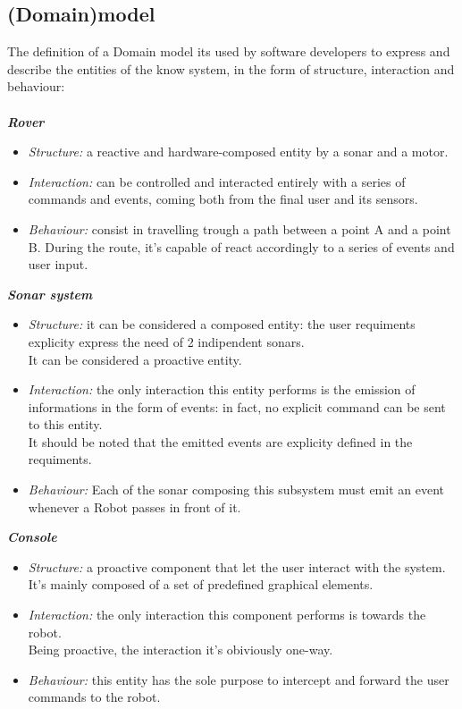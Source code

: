 \documentclass{llncs}
\begin{document}
\subsection{(Domain)model}
The definition of a Domain model its used by software developers to express and describe the entities of the know system, in the form of structure, interaction and behaviour:\\\\
\textit{\textbf{Rover}}
\begin{itemize}
\item \textit{Structure:} a reactive and hardware-composed entity by a sonar and a motor.
\item \textit{Interaction:} can be controlled and interacted entirely with a series of commands and events, coming both from the final user and 										its sensors.
\item \textit{Behaviour:} consist in travelling trough a path between a point A and a point B.
During the route, it's capable of react accordingly to a series of events and user input.
\end{itemize}
\textit{\textbf{Sonar system}}
\begin{itemize}
\item \textit{Structure:} it can be considered a composed entity: the user requiments explicity express the need of 2 indipendent sonars.\\It can be considered a proactive entity.
\item \textit{Interaction:} the only interaction this entity performs is the emission of informations in the form of events: in fact, no explicit command can be sent to this entity.\\
It should be noted that the emitted events are explicity defined in the requiments.
\item \textit{Behaviour:} Each of the sonar composing this subsystem must emit an event whenever a Robot passes in front of it. 
\end{itemize}
\textit{\textbf{Console}}
\begin{itemize}
\item \textit{Structure:} a proactive component that let the user interact with the system.\\ It's mainly composed of a set of predefined graphical elements.
\item \textit{Interaction:} the only interaction this component performs is towards the robot.\\Being proactive, the interaction it's obiviously one-way.
\item \textit{Behaviour:} this entity has the sole purpose to intercept and forward the user commands to the robot.
\end{itemize}
\end{document}
